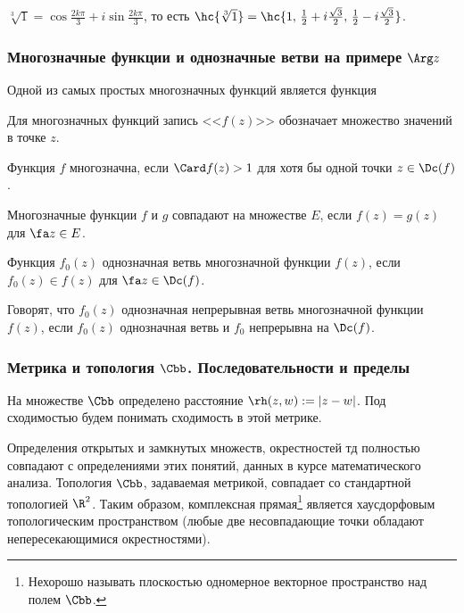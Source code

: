 \documentclass[a4paper]{article}
\begin{document}
\begin{ex}
$\sqrt[3]{1} = \cos \frac{2k\pi}{3} + i\sin \frac{2k\pi}{3}$, то есть
$\hc{\sqrt[3]{1}} = \hc{1,\, \frac{1}{2} + i\frac{\sqrt3}{2},\, \frac{1}{2} - i\frac{\sqrt3}{2}}$.
\end{ex}

\subsubsection{Многозначные функции и однозначные ветви на примере $\Arg z$}

Одной из самых простых многозначных функций является функция


Для многозначных функций запись <<$f(z)$>> обозначает множество значений в точке $z$.

\begin{df}
Функция $f$ многозначна, если $\Card f(z) > 1$ для хотя бы одной точки $z\in \Dc(f)$.
\end{df}

\begin{df}
Многозначные функции $f$ и $g$ совпадают на множестве $E$, если $f(z) = g(z)$ для $\fa z \in E$.
\end{df}

\begin{df}
Функция $f_0(z)$ однозначная ветвь многозначной функции $f(z)$, если
$f_0(z) \in f(z)$ для $\fa z \in \Dc(f)$.
\end{df}

\begin{df}
Говорят, что $f_0(z)$ однозначная непрерывная ветвь многозначной функции $f(z)$, если
$f_0(z)$ однозначная ветвь и $f_0$ непрерывна на $\Dc(f)$.
\end{df}

\subsubsection{Метрика и топология $\Cbb$. Последовательности и пределы}

На множестве $\Cbb$ определено расстояние $\rh(z,w) := |z-w|$. Под сходимостью будем понимать
сходимость в этой метрике.

Определения открытых и замкнутых множеств, окрестностей тд полностью совпадают с определениями этих понятий,
данных в курсе математического анализа. Топология $\Cbb$, задаваемая метрикой, совпадает со стандартной топологией $\R^2$.
Таким образом, комплексная прямая\footnote{Нехорошо называть плоскостью одномерное векторное пространство над полем $\Cbb$.}
является хаусдорфовым топологическим пространством (любые две несовпадающие точки обладают непересекающимися окрестностями).
\end{document}
